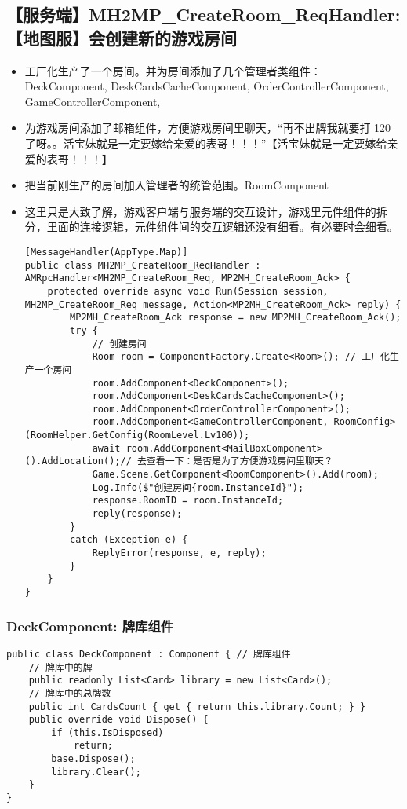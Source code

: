\documentclass[9pt, b5paper]{article}
\begin{document}
\subsection{【服务端】MH2MP\_CreateRoom\_ReqHandler:【地图服】会创建新的游戏房间}
\label{sec-1-5}
\begin{itemize}
\item 工厂化生产了一个房间。并为房间添加了几个管理者类组件：DeckComponent, DeskCardsCacheComponent, OrderControllerComponent, GameControllerComponent,
\item 为游戏房间添加了邮箱组件，方便游戏房间里聊天，“再不出牌我就要打 120 了呀。。活宝妹就是一定要嫁给亲爱的表哥！！！”【活宝妹就是一定要嫁给亲爱的表哥！！！】
\item 把当前刚生产的房间加入管理者的统管范围。RoomComponent
\item 这里只是大致了解，游戏客户端与服务端的交互设计，游戏里元件组件的拆分，里面的连接逻辑，元件组件间的交互逻辑还没有细看。有必要时会细看。
\begin{verbatim}
[MessageHandler(AppType.Map)]
public class MH2MP_CreateRoom_ReqHandler : AMRpcHandler<MH2MP_CreateRoom_Req, MP2MH_CreateRoom_Ack> {
    protected override async void Run(Session session, MH2MP_CreateRoom_Req message, Action<MP2MH_CreateRoom_Ack> reply) {
        MP2MH_CreateRoom_Ack response = new MP2MH_CreateRoom_Ack();
        try {
            // 创建房间
            Room room = ComponentFactory.Create<Room>(); // 工厂化生产一个房间
            room.AddComponent<DeckComponent>();
            room.AddComponent<DeskCardsCacheComponent>();
            room.AddComponent<OrderControllerComponent>();
            room.AddComponent<GameControllerComponent, RoomConfig>(RoomHelper.GetConfig(RoomLevel.Lv100));
            await room.AddComponent<MailBoxComponent>().AddLocation();// 去查看一下：是否是为了方便游戏房间里聊天？
            Game.Scene.GetComponent<RoomComponent>().Add(room);
            Log.Info($"创建房间{room.InstanceId}");
            response.RoomID = room.InstanceId;
            reply(response);
        }
        catch (Exception e) {
            ReplyError(response, e, reply);
        }
    }
}
\end{verbatim}
\end{itemize}
\subsubsection{DeckComponent: 牌库组件}
\label{sec-1-5-1}
\begin{verbatim}
public class DeckComponent : Component { // 牌库组件
    // 牌库中的牌
    public readonly List<Card> library = new List<Card>();
    // 牌库中的总牌数
    public int CardsCount { get { return this.library.Count; } }
    public override void Dispose() {
        if (this.IsDisposed) 
            return;
        base.Dispose();
        library.Clear();
    }
}
\end{verbatim}
\end{document}
